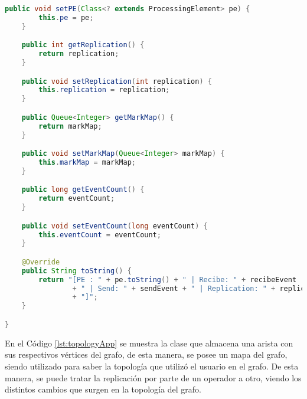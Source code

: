 \begin{lstlisting}[caption={Clase StatusPE, el cual contiene las estad\'isticas de un PE espec\'ifico.},label={lst:statusPE},language=Java]
	public void setPE(Class<? extends ProcessingElement> pe) {
		this.pe = pe;
	}

	public int getReplication() {
		return replication;
	}

	public void setReplication(int replication) {
		this.replication = replication;
	}

	public Queue<Integer> getMarkMap() {
		return markMap;
	}

	public void setMarkMap(Queue<Integer> markMap) {
		this.markMap = markMap;
	}

	public long getEventCount() {
		return eventCount;
	}

	public void setEventCount(long eventCount) {
		this.eventCount = eventCount;
	}

	@Override
	public String toString() {
		return "[PE : " + pe.toString() + " | Recibe: " + recibeEvent
				+ " | Send: " + sendEvent + " | Replication: " + replication
				+ "]";
	}

}

\end{lstlisting}

En el C\'odigo \ref{lst:topologyApp} se muestra la clase que almacena una arista con sus respectivos v\'ertices del grafo, de esta manera, se posee un mapa del grafo, siendo utilizado para saber la topolog\'ia que utiliz\'o el usuario en el grafo. De esta manera, se puede tratar la replicaci\'on por parte de un operador a otro, viendo los distintos cambios que surgen en la topolog\'ia del grafo.

